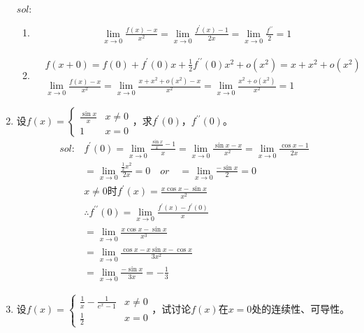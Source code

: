 \begin{enumerate}[{例}1.]
        $sol:$
        \begin{enumerate}[$1^\circ$]
            \item
                \begin{align*}
                    &\lim_{x \to 0}\frac{f(x)-x}{x^2}= \lim_{x\to 0}\frac{f^{\prime}(x)-1}{2x}= \lim_{x\to 0}\frac{f^{\prime\prime}}{2}= 1
                \end{align*}
            \item
                \begin{align*}
                    &f(x+0)=f(0)+f^{\prime}(0)x+\frac{1}{2}f^{\prime\prime}(0)x^2+o(x^2)=x+x^2+o(x^2)\\
                    &\lim_{x \to 0}\frac{f(x)-x}{x^2}=\lim_{x\to 0}\frac{x+x^2+o(x^2)-x}{x^2}=\lim_{x\to 0}\frac{x^2+o(x^2)}{x^2}=1
                \end{align*}
        \end{enumerate}
    \item 设$f(x)=\begin{cases}\frac{\sin x}{x} & x \neq 0\\
                               1 & x = 0
                           \end{cases}$，求$f^{\prime}(0)$，$f^{\prime\prime}(0)$。
        \begin{align*}
            sol:&f^{\prime}(0)=\lim_{x\to 0}\frac{\frac{\sin x}{x}-1}{x}=\lim_{x \to 0}\frac{\sin x-x}{x^2}=\lim_{x\to 0}\frac{\cos x-1}{2x}\\
                &=\lim_{x\to 0}\frac{\frac{1}{2}x^2}{2x}=0\quad or\quad=\lim_{x\to 0}\frac{-\sin x}{2}=0\\
                &x\neq 0\mbox{时}f^{\prime}(x)=\frac{x\cos x-\sin x}{x^2}\\
                &\therefore f^{\prime\prime}(0)=\lim_{x\to 0}\frac{f^{\prime}(x)-f^{\prime}(0)}{x}\\
                &=\lim_{x\to 0}\frac{x\cos x-\sin x}{x^3}\\
                &=\lim_{x\to 0}\frac{\cos x-x\sin x-\cos x}{3x^2}\\
                &=\lim_{x\to 0}\frac{-\sin x}{3x}=-\frac{1}{3}
        \end{align*}
    \item 设$f(x)=\begin{cases}\frac{1}{x}-\frac{1}{e^x -1} & x \neq 0\\
                                                    \frac{1}{2} & x = 0
                    \end{cases}$，试讨论$f(x)$在$x=0$处的连续性、可导性。
                    

\end{enumerate}
